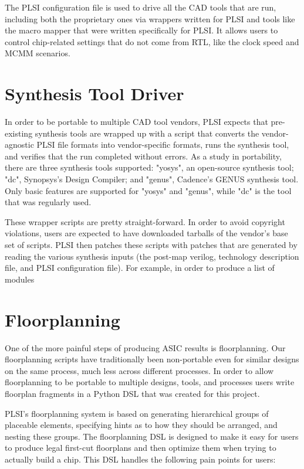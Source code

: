 \documentclass{article}
\begin{document}
The PLSI configuration file is used to drive all the CAD tools that are run,
including both the proprietary ones via wrappers written for PLSI and tools
like the macro mapper that were written specifically for PLSI.  It allows users
to control chip-related settings that do not come from RTL, like the clock
speed and MCMM scenarios.

\section{Synthesis Tool Driver}

In order to be portable to multiple CAD tool vendors, PLSI expects that
pre-existing synthesis tools are wrapped up with a script that converts the
vendor-agnostic PLSI file formats into vendor-specific formats, runs the
synthesis tool, and verifies that the run completed without errors.  As a study
in portability, there are three synthesis tools supported: "yosys", an
open-source synthesis tool; "dc", Synopsys's Design Compiler; and "genus",
Cadence's GENUS synthesis tool.  Only basic features are supported for "yosys"
and "genus", while "dc" is the tool that was regularly used.

These wrapper scripts are pretty straight-forward.  In order to avoid copyright
violations, users are expected to have downloaded tarballs of the vendor's base
set of scripts.  PLSI then patches these scripts with patches that are
generated by reading the various synthesis inputs (the post-map verilog,
technology description file, and PLSI configuration file).  For example, in
order to produce a list of modules

\section{Floorplanning}

One of the more painful steps of producing ASIC results is floorplanning.  Our
floorplanning scripts have traditionally been non-portable even for similar
designs on the same process, much less across different processes.  In order to
allow floorplanning to be portable to multiple designs, tools, and processes
users write floorplan fragments in a Python DSL that was created for this
project.

PLSI's floorplanning system is based on generating hierarchical groups of
placeable elements, specifying hints as to how they should be arranged, and
nesting these groups.  The floorplanning DSL is designed to make it easy for
users to produce legal first-cut floorplans and then optimize them when trying
to actually build a chip.  This DSL handles the following pain points for users:
\end{document}
